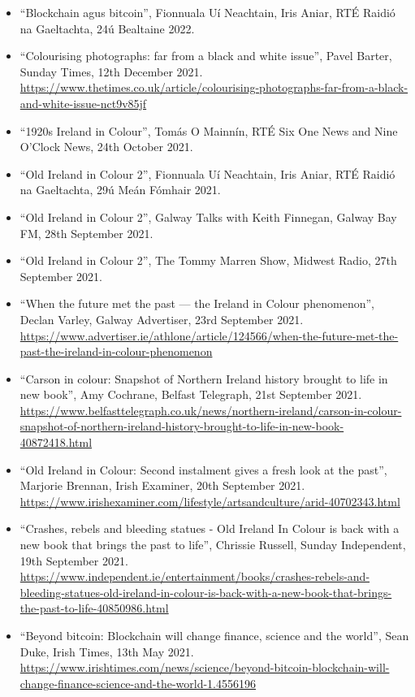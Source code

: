 \documentclass[10pt,a4paper]{res} %
\begin{document}
\begin{resume}
{\begin{itemize} \itemsep -2pt
\renewcommand\labelitemi{$\circ$}
\item ``Blockchain agus bitcoin'', Fionnuala U\'{i} Neachtain, Iris Aniar, RT\'{E} Raidi\'{o} na Gaeltachta, 24\'{u} Bealtaine 2022.
\item ``Colourising photographs: far from a black and white issue'', Pavel Barter, Sunday Times, 12th December 2021. \url{https://www.thetimes.co.uk/article/colourising-photographs-far-from-a-black-and-white-issue-nct9v85jf}
\item ``1920s Ireland in Colour'', Tom\'{a}s O Mainn\'{i}n, RT\'{E} Six One News and Nine O'Clock News, 24th October 2021.
\item ``Old Ireland in Colour 2'', Fionnuala U\'{i} Neachtain, Iris Aniar, RT\'{E} Raidi\'{o} na Gaeltachta, 29\'{u} Me\'{a}n F\'{o}mhair 2021.
\item ``Old Ireland in Colour 2'', Galway Talks with Keith Finnegan, Galway Bay FM, 28th September 2021.
\item ``Old Ireland in Colour 2'', The Tommy Marren Show, Midwest Radio, 27th September 2021.
\item ``When the future met the past — the Ireland in Colour phenomenon'', Declan Varley, Galway Advertiser, 23rd September 2021. \url{https://www.advertiser.ie/athlone/article/124566/when-the-future-met-the-past-the-ireland-in-colour-phenomenon}
\item ``Carson in colour: Snapshot of Northern Ireland history brought to life in new book'', Amy Cochrane, Belfast Telegraph, 21st September 2021. \url{https://www.belfasttelegraph.co.uk/news/northern-ireland/carson-in-colour-snapshot-of-northern-ireland-history-brought-to-life-in-new-book-40872418.html}
\item ``Old Ireland in Colour: Second instalment gives a fresh look at the past'', Marjorie Brennan, Irish Examiner, 20th September 2021. \url{https://www.irishexaminer.com/lifestyle/artsandculture/arid-40702343.html}
\item ``Crashes, rebels and bleeding statues - Old Ireland In Colour is back with a new book that brings the past to life'', Chrissie Russell, Sunday Independent, 19th September 2021. \url{https://www.independent.ie/entertainment/books/crashes-rebels-and-bleeding-statues-old-ireland-in-colour-is-back-with-a-new-book-that-brings-the-past-to-life-40850986.html}
\item ``Beyond bitcoin: Blockchain will change finance, science and the world'', Sean Duke, Irish Times, 13th May 2021. \url{https://www.irishtimes.com/news/science/beyond-bitcoin-blockchain-will-change-finance-science-and-the-world-1.4556196}

\end{itemize}}
\end{resume}
\end{document}
